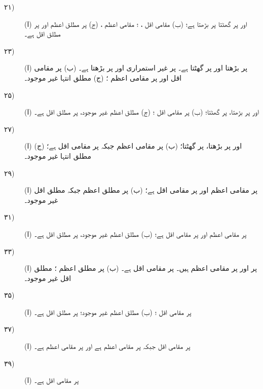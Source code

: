 \begin {description}
\item [
\protect ۲۱)
]
 (ا)  اور  پر گھٹتا  پر بڑھتا ہے؛ (ب) مقامی اقل ، ؛ مقامی اعظم ،  (ج)  پر مطلق اعظم  اور  پر مطلق اقل  ہے۔ 
\item [
\protect ۲۳)
]
 (ا)  پر بڑھتا  اور  پر گھٹتا ہے۔  پر غیر استمراری اور  پر بڑھتا ہے۔ (ب)  پر مقامی اقل  اور  پر مقامی اعظم  ؛ (ج) مطلق انتہا غیر موجود۔ 
\item [
\protect ۲۵)
]
 (ا)  اور  پر بڑھتا،  پر گھٹتا؛ (ب)  پر مقامی اقل ؛ (ج) مطلق اعظم غیر موجود،  پر مطلق اقل  ہے۔ 
\item [
\protect ۲۷)
]
 (ا)  اور  پر بڑھتا،  پر گھٹتا؛ (ب)  پر مقامی اعظم  جبکہ  پر مقامی اقل  ہے؛ (ج) مطلق انتہا غیر موجود۔ 
\item [
\protect ۲۹)
]
 (ا)  پر مقامی اعظم  اور  پر مقامی اقل  ہے؛ (ب)  پر مطلق اعظم  جبکہ مطلق اقل غیر موجود۔ 
\item [
\protect ۳۱)
]
 (ا)  پر مقامی اعظم  اور  پر مقامی اقل  ہے؛ (ب) مطلق اعظم غیر موجود،  پر مطلق اقل  ہے۔ 
\item [
\protect ۳۳)
]
 (ا)  پر  اور  پر  مقامی اعظم ہیں۔  پر مقامی اقل  ہے۔ (ب)  پر مطلق اعظم ؛ مطلق اقل غیر موجود۔ 
\item [
\protect ۳۵)
]
 (ا)  پر مقامی اقل ؛ (ب) مطلق اعظم غیر موجود؛  پر مطلق اقل  ہے۔ 
\item [
\protect ۳۷)
]
 (ا)  پر مقامی اقل  جبکہ  پر مقامی اعظم  ہے اور  پر مقامی اعظم  ہے۔ 
\item [
\protect ۳۹)
]
 (ا)  پر مقامی اقل  ہے۔ 

\end{description}
